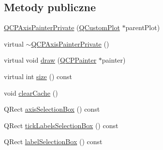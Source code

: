 \subsection*{Metody publiczne}
\begin{DoxyCompactItemize}
\item 
\hyperlink{class_q_c_p_axis_painter_private_a0f14aa5c4aa83dbcd68984a7c73bf94f}{Q\+C\+P\+Axis\+Painter\+Private} (\hyperlink{class_q_custom_plot}{Q\+Custom\+Plot} $\ast$parent\+Plot)
\item 
virtual \hyperlink{class_q_c_p_axis_painter_private_a7c7f95313f0f78c3c3975f822a5fea35}{$\sim$\+Q\+C\+P\+Axis\+Painter\+Private} ()
\item 
virtual void \hyperlink{class_q_c_p_axis_painter_private_a0207a99bdf9c4f70af20928898ddc2fc}{draw} (\hyperlink{class_q_c_p_painter}{Q\+C\+P\+Painter} $\ast$painter)
\item 
virtual int \hyperlink{class_q_c_p_axis_painter_private_a8b2dc0bd2ccbf6bd450733ec9e410a38}{size} () const 
\item 
void \hyperlink{class_q_c_p_axis_painter_private_a7b6806e32c44384fd0ae4dcdaa72b1b5}{clear\+Cache} ()
\item 
Q\+Rect \hyperlink{class_q_c_p_axis_painter_private_aaf93529ac60215ea020cdff5635c3e80}{axis\+Selection\+Box} () const 
\item 
Q\+Rect \hyperlink{class_q_c_p_axis_painter_private_af02fc189ab8460c202eb4138c9aca516}{tick\+Labels\+Selection\+Box} () const 
\item 
Q\+Rect \hyperlink{class_q_c_p_axis_painter_private_ae907476bf8cf0ecd17620575e17c06b1}{label\+Selection\+Box} () const 
\end{DoxyCompactItemize}
